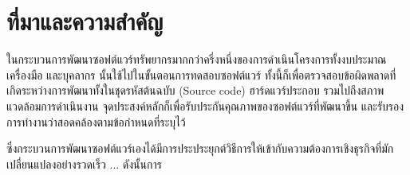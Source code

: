 \section{ที่มาและความสำคัญ} 

ในกระบวนการพัฒนาซอฟต์แวร์ทรัพยากรมากกว่าครึ่งหนึ่งของการดำเนินโครงการทั้งงบประมาณ เครื่องมือ และบุคลากร นั้นใช้ไปในขั้นตอนการทดสอบซอฟต์แวร์ %
ทั้งนี้ก็เพื่อตรวจสอบข้อผิดพลาดที่เกิดระหว่างการพัฒนาทั้งในชุดรหัสต้นฉบับ (Source code) ฮาร์ดแวร์ประกอบ รวมไปถึงสภาพแวดล้อมการดำเนินงาน 
จุดประสงค์หลักก็เพื่อรับประกันคุณภาพของซอฟต์แวร์ที่พัฒนาขึ้น และรับรองการทำงานว่าสอดคล้องตามข้อกำหนดที่ระบุไว้

ซึ่งกระบวนการพัฒนาซอฟต์แวร์เองได้มีการประประยุกต์วิธีการให้เข้ากับความต้องการเชิงธุรกิจที่มักเปลี่ยนแปลงอย่างรวดเร็ว ... ดังนั้นการ

